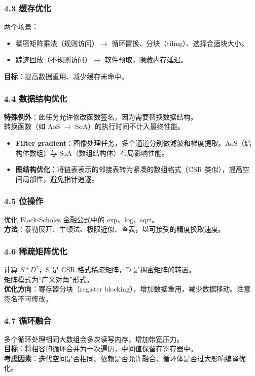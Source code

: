 \documentclass[11pt, a4paper]{article}
\begin{document}
\begin{aibox}
\subsubsection*{4.3 缓存优化}
两个场景：
\begin{itemize}
    \item 稠密矩阵乘法（规则访问）$\rightarrow$ 循环置换、分块（tiling）、选择合适块大小。
    \item 踪迹回放（不规则访问）$\rightarrow$ 软件预取，隐藏内存延迟。
\end{itemize}
\textbf{目标}：提高数据重用、减少缓存未命中。

\subsubsection*{4.4 数据结构优化}
\textbf{特殊例外}：此任务允许修改函数签名，因为需要替换数据结构。\\
转换函数（如 AoS $\rightarrow$ SoA）的执行时间不计入最终性能。
\begin{itemize}
    \item \textbf{Filter gradient}：图像处理任务，多个通道分别做滤波和梯度提取。AoS（结构体数组）与 SoA（数组结构体）布局影响性能。
    \item \textbf{图结构优化}：将链表表示的邻接表转为紧凑的数组格式（CSR 类似），提高空间局部性，避免指针追逐。
\end{itemize}

\subsubsection*{4.5 位操作}
优化 Black-Scholes 金融公式中的 exp、log、sqrt。\\
\textbf{方法}：泰勒展开、牛顿法、极限近似、查表，以可接受的精度换取速度。

\subsubsection*{4.6 稀疏矩阵优化}
计算 $S * D^T$，S 是 CSR 格式稀疏矩阵，D 是稠密矩阵的转置。\\
矩阵模式为“广义对角”形式。\\
\textbf{优化方向}：寄存器分块（register blocking），增加数据重用，减少数据移动。注意签名不可修改。

\subsubsection*{4.7 循环融合}
多个循环处理相同大数组会多次读写内存，增加带宽压力。\\
\textbf{目标}：将相容的循环合并为一次遍历，中间值保留在寄存器中。\\
\textbf{考虑因素}：迭代空间是否相同、依赖是否允许融合、循环体是否过大影响编译优化。


\end{aibox}
\end{document}
